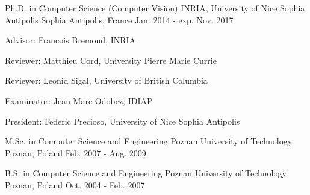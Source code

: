 

\begin{cventries}

  \cventry
    {Ph.D. in Computer Science (Computer Vision)} %
    {INRIA, University of Nice Sophia Antipolis} %
    {Sophia Antipolis, France} %
    {Jan. 2014 - exp. Nov. 2017} %
    {
      \begin{cvitems} %
		\item {Advisor: Francois Bremond, INRIA}
		\item {Reviewer: Matthieu Cord, University Pierre Marie Currie}
		\item {Reviewer: Leonid Sigal, University of British Columbia}
		\item {Examinator: Jean-Marc Odobez, IDIAP}
		\item {President: Federic Precioso, University of Nice Sophia Antipolis}
      \end{cvitems}
    }
	
  \cventry
    {M.Sc. in Computer Science and Engineering} %
    {Poznan University of Technology} %
    {Poznan, Poland} %
    {Feb. 2007 - Aug. 2009} %
	{}

  \cventry
    {B.S. in Computer Science and Engineering} %
    {Poznan University of Technology} %
    {Poznan, Poland} %
    {Oct. 2004 - Feb. 2007} %
    {}


\end{cventries}
